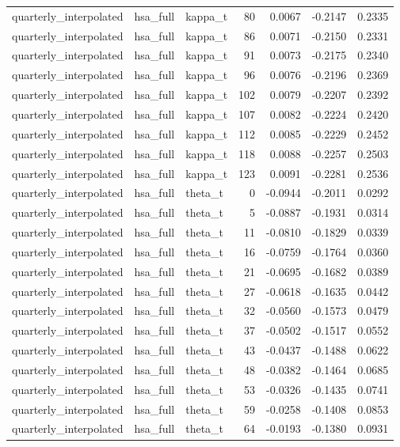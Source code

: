 \begin{tabular}{lllrrrr}
quarterly\_interpolated & hsa\_full & kappa\_t & 80 & 0.0067 & -0.2147 & 0.2335 \\
quarterly\_interpolated & hsa\_full & kappa\_t & 86 & 0.0071 & -0.2150 & 0.2331 \\
quarterly\_interpolated & hsa\_full & kappa\_t & 91 & 0.0073 & -0.2175 & 0.2340 \\
quarterly\_interpolated & hsa\_full & kappa\_t & 96 & 0.0076 & -0.2196 & 0.2369 \\
quarterly\_interpolated & hsa\_full & kappa\_t & 102 & 0.0079 & -0.2207 & 0.2392 \\
quarterly\_interpolated & hsa\_full & kappa\_t & 107 & 0.0082 & -0.2224 & 0.2420 \\
quarterly\_interpolated & hsa\_full & kappa\_t & 112 & 0.0085 & -0.2229 & 0.2452 \\
quarterly\_interpolated & hsa\_full & kappa\_t & 118 & 0.0088 & -0.2257 & 0.2503 \\
quarterly\_interpolated & hsa\_full & kappa\_t & 123 & 0.0091 & -0.2281 & 0.2536 \\
quarterly\_interpolated & hsa\_full & theta\_t & 0 & -0.0944 & -0.2011 & 0.0292 \\
quarterly\_interpolated & hsa\_full & theta\_t & 5 & -0.0887 & -0.1931 & 0.0314 \\
quarterly\_interpolated & hsa\_full & theta\_t & 11 & -0.0810 & -0.1829 & 0.0339 \\
quarterly\_interpolated & hsa\_full & theta\_t & 16 & -0.0759 & -0.1764 & 0.0360 \\
quarterly\_interpolated & hsa\_full & theta\_t & 21 & -0.0695 & -0.1682 & 0.0389 \\
quarterly\_interpolated & hsa\_full & theta\_t & 27 & -0.0618 & -0.1635 & 0.0442 \\
quarterly\_interpolated & hsa\_full & theta\_t & 32 & -0.0560 & -0.1573 & 0.0479 \\
quarterly\_interpolated & hsa\_full & theta\_t & 37 & -0.0502 & -0.1517 & 0.0552 \\
quarterly\_interpolated & hsa\_full & theta\_t & 43 & -0.0437 & -0.1488 & 0.0622 \\
quarterly\_interpolated & hsa\_full & theta\_t & 48 & -0.0382 & -0.1464 & 0.0685 \\
quarterly\_interpolated & hsa\_full & theta\_t & 53 & -0.0326 & -0.1435 & 0.0741 \\
quarterly\_interpolated & hsa\_full & theta\_t & 59 & -0.0258 & -0.1408 & 0.0853 \\
quarterly\_interpolated & hsa\_full & theta\_t & 64 & -0.0193 & -0.1380 & 0.0931 \\

\end{tabular}
